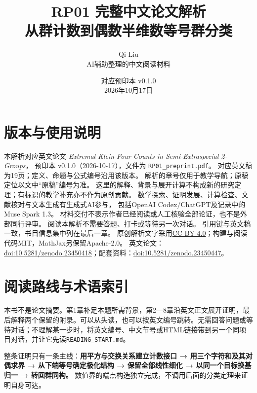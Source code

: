 \documentclass[UTF8,fontset=fandol,zihao=-4,openany,oneside]{ctexbook}
\title{RP01 完整中文论文解析\\\large 从群计数到偶数半维数等号群分类}
\author{Qi Liu\\\small AI辅助整理的中文阅读材料}
\date{对应预印本 v0.1.0\\2026年10月17日}
\begin{document}
\frontmatter\maketitle
\chapter*{版本与使用说明}
本解析对应英文论文 \emph{Extremal Klein Four Counts in Semi-Extraspecial 2-Groups}，
预印本 v0.1.0（2026-10-17），文件为 \texttt{RP01\_preprint.pdf}。
对应英文稿为19页；定义、命题与公式编号沿用该版本。
解析的章号仅用于教学导航；原稿定位以文中“原稿”编号为准。
这里的解释、背景与展开计算不构成新的研究定理；有标识的教学补充亦不作为原创贡献。
数学探索、证明发展、计算检查、文献核对与文本生成有生成式AI参与，
包括OpenAI Codex/ChatGPT及记录中的Muse Spark 1.3。
材料交付不表示作者已经阅读或人工核验全部论证，也不是外部同行评审。
阅读本解析不需要答题、打卡或等待另一次对话。
引用键与英文稿一致，书目信息集中列在最后一章。
原创解析文字采用\href{https://creativecommons.org/licenses/by/4.0/}{CC BY 4.0}；构建与阅读代码MIT，MathJax另保留Apache-2.0。
英文论文：\href{https://doi.org/10.5281/zenodo.23450418}{doi:10.5281/zenodo.23450418}；配套资料：\href{https://doi.org/10.5281/zenodo.23450447}{doi:10.5281/zenodo.23450447}。

\chapter*{阅读路线与术语索引}


本书不是论文摘要。第1章补足本题所需背景，第2—8章沿英文正文展开证明，最后解释两个保留的附录。可以从头读，也可以按英文编号跳转。无需回答问题或等待对话；不理解某一步时，将英文编号、中文节号或HTML链接带到另一个同项目对话，并让它先读\texttt{READING\_START.md}。



整条证明只有一条主线：\textbf{用平方与交换关系建立计数接口 → 用三个字符和及其对偶求界 → 从下端等号确定极化结构 → 保留全部线性细化 → 以同一个目标换基归一 → 转回群同构。} 数值界的端点构造独立完成，不调用后面的分类定理来证明自身可达。
\end{document}
